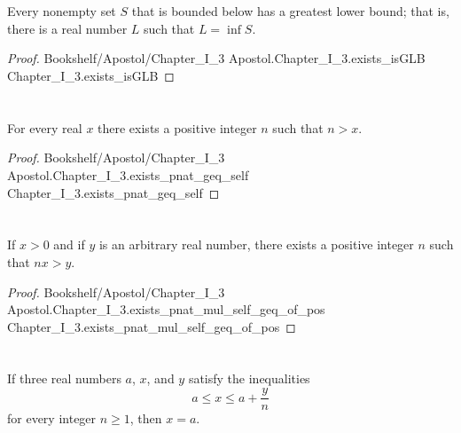 \documentclass{article}
\newcommand{\link}[1]{\lean{../..}
  {Bookshelf/Apostol/Chapter\_I\_3}
  {Apostol.Chapter\_I\_3.#1}
  {Chapter\_I\_3.#1}
}
\begin{document}

\section*{}%
%

Every nonempty set $S$ that is bounded below has a greatest lower bound; that
is, there is a real number $L$ such that $L = \inf{S}$.

\begin{proof}

  \link{exists\_isGLB}

\end{proof}

\section*{}%

For every real $x$ there exists a positive integer $n$ such that $n > x$.

\begin{proof}

  \link{exists\_pnat\_geq\_self}

\end{proof}

\section*{}%
%

If $x > 0$ and if $y$ is an arbitrary real number, there exists a positive
integer $n$ such that $nx > y$.


\begin{proof}

  \link{exists\_pnat\_mul\_self\_geq\_of\_pos}

\end{proof}

\section*{}%
%

If three real numbers $a$, $x$, and $y$ satisfy the inequalities
$$a \leq x \leq a + \frac{y}{n}$$
for every integer $n \geq 1$, then $x = a$.
\end{document}
